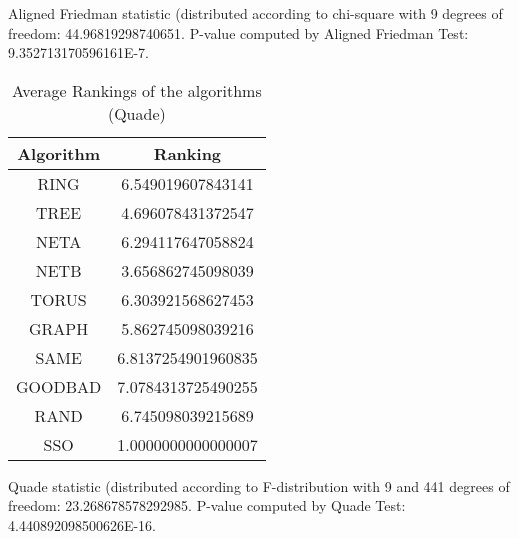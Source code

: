 \documentclass[a4paper,10pt]{article}
\begin{document}
\begin{landscape}
Aligned Friedman statistic (distributed according to chi-square with 9 degrees of freedom: 44.96819298740651. 
P-value computed by Aligned Friedman Test: 9.352713170596161E-7.\newline


\newpage

\begin{table}[!htp]
\centering
\caption{Average Rankings of the algorithms (Quade)
}\begin{tabular}{c|c}
Algorithm&Ranking\\
\hline
 RING&6.549019607843141\\
 TREE&4.696078431372547\\
 NETA&6.294117647058824\\
 NETB&3.656862745098039\\
 TORUS&6.303921568627453\\
 GRAPH&5.862745098039216\\
 SAME&6.8137254901960835\\
 GOODBAD&7.0784313725490255\\
 RAND&6.745098039215689\\
 SSO&1.0000000000000007\\
\end{tabular}
\end{table}
Quade statistic (distributed according to F-distribution with 9 and 441 degrees of freedom: 23.268678578292985. 
P-value computed by Quade Test: 4.440892098500626E-16.\newline


\newpage


\end{landscape}
\end{document}
